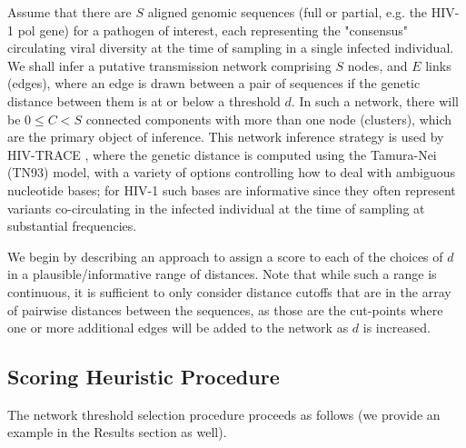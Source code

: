 \documentclass[utf8]{FrontiersinHarvard} %
\begin{document}
Assume that there are $S$ aligned genomic sequences (full or partial, e.g. the
HIV-1 pol gene) for a pathogen of interest, each representing the "consensus"
circulating viral diversity at the time of sampling in a single infected
individual. We shall infer a putative transmission network comprising $S$
nodes, and $E$ links (edges), where an edge is drawn between a pair of
sequences if the genetic distance between them is at or below a threshold $d$.
In such a network, there will be $0 \leq C < S$ connected components with more
than one node (clusters), which are the primary object of inference. This
network inference strategy is used by HIV-TRACE
\citep{kosakovsky_pond_hiv-trace_2018}, where the genetic distance is computed
using the Tamura-Nei (TN93) \citep{tamura_estimation_1993} model, with a
variety of options controlling how to deal with ambiguous nucleotide bases; for
HIV-1 such bases are informative since they often represent variants
co-circulating in the infected individual at the time of sampling at
substantial frequencies.

We begin by describing an approach to assign a score to each of the choices of
$d$ in a plausible/informative range of distances. Note that while such a range
is continuous, it is sufficient to only consider distance cutoffs that are in
the array of pairwise distances between the sequences, as those are the
cut-points where one or more additional edges will be added to the network as
$d$ is increased.

\subsection{Scoring Heuristic Procedure}

The network threshold selection procedure proceeds as follows (we provide an
example in the Results section as well).
\end{document}
